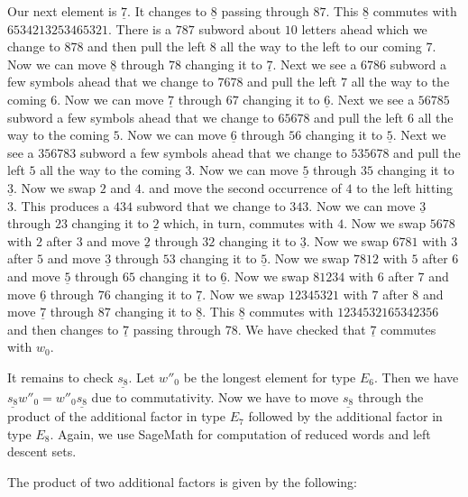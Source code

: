\documentclass[a4paper]{amsart}
\begin{document}
Our next element is  $\underline{7}$. It changes to
$\underline{8}$ passing through  $87$.
This $\underline{8}$ commutes with $6534213253465321$.
There is a $787$ subword about $10$ letters ahead which
we change to $878$ and then pull the left $8$ all the
way to the left to our coming $7$. Now we can move
$\underline{8}$ through  $78$ changing it to $\underline{7}$.
Next we see a $6786$ subword a few symbols ahead that we change to
$7678$ and pull the left $7$ all the way to the coming $6$.
Now we can move $\underline{7}$ through  $67$ changing 
it to $\underline{6}$.
Next we see a $56785$ subword a few symbols ahead that we change to
$65678$ and pull the left $6$ all the way to the coming $5$.
Now we can move $\underline{6}$ through  $56$ changing 
it to $\underline{5}$.
Next we see a $356783$ subword a few symbols ahead that we change to
$535678$ and pull the left $5$ all the way to the coming $3$.
Now we can move $\underline{5}$ through  $35$ changing 
it to $\underline{3}$. Now we swap $2$ and $4$.
and move the second occurrence of $4$ to the left
hitting $3$. This produces a $434$ subword that we
change to $343$. Now we can move $\underline{3}$
through $23$ changing it to $\underline{2}$
which, in turn, commutes with $4$. Now we
swap $5678$ with $2$ after $3$ and move 
$\underline{2}$ through $32$ changing it to $\underline{3}$.
Now we swap $6781$ with $3$ after $5$ and move 
$\underline{3}$ through $53$ changing it to $\underline{5}$.
Now we swap $7812$ with $5$ after $6$ and move 
$\underline{5}$ through $65$ changing it to $\underline{6}$.
Now we swap $81234$ with $6$ after $7$ and move 
$\underline{6}$ through $76$ changing it to $\underline{7}$.
Now we swap $12345321$ with $7$ after $8$ and move 
$\underline{7}$ through $87$ changing it to $\underline{8}$.
This $\underline{8}$ commutes with $1234532165342356$
and then changes to $\underline{7}$ passing through
$78$. We have checked that 
$\underline{7}$ commutes with $w_0$.

It remains to check $\underline{s_{8}}$. Let
$w''_0$ be the longest element for type $E_6$.
Then we have $\underline{s_{8}}w''_0=w''_0\underline{s_{8}}$
due to commutativity. Now we have to move 
$\underline{s_{8}}$ through the product of the additional
factor in type $E_7$ followed by the additional factor in
type $E_8$. Again, we use SageMath for computation of 
reduced words and left descent sets.

The product of two additional factors is given by the following:

\end{document}
